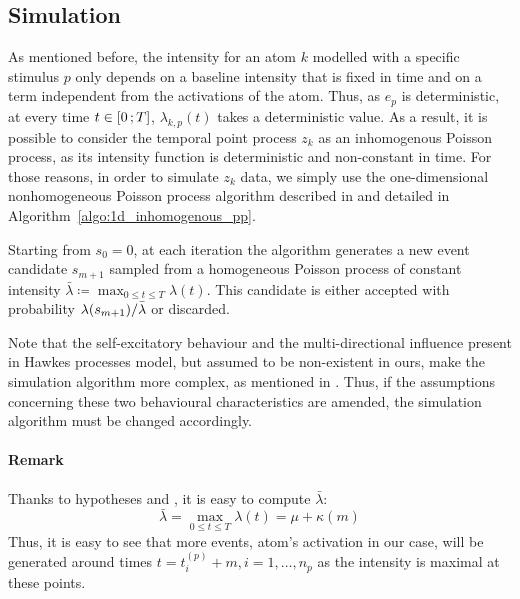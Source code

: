 \subsection{Simulation}

As mentioned before, the intensity for an atom $k$ modelled with a specific stimulus $p$ only depends on a baseline intensity that is fixed in time and on a term independent from the activations of the atom.
Thus, as $e_p$ is deterministic, at every time $t \in \left[ 0 \, ; T \right]$, $\lambda_{k,p}(t)$ takes a deterministic value.
As a result, it is possible to consider the temporal point process $z_k$ as an inhomogenous Poisson process, as its intensity function is deterministic and non-constant in time.
For those reasons, in order to simulate $z_k$ data, we simply use the one-dimensional nonhomogeneous Poisson process algorithm described in \citep{lewis1979simulation, chen2016thinning} and detailed in Algorithm~\ref{algo:1d_inhomogenous_pp}.

Starting from $s_0=0$, at each iteration the algorithm generates a new event candidate $s_{m+1}$ sampled from a homogeneous Poisson process of constant intensity $\bar{\lambda} \coloneqq \max_{0\leq t \leq T} \lambda(t)$.
This candidate is either accepted with probability $\lambda(s_{m+1})/\Bar{\lambda}$ or discarded.

Note that the self-excitatory behaviour and the multi-directional influence present in Hawkes processes model, but assumed to be non-existent in ours, make the simulation algorithm more complex, as mentioned in \citep{ogata1981lewis, chen2016thinning, bompaire2019machine}.
Thus, if the assumptions concerning these two behavioural characteristics are amended, the simulation algorithm must be changed accordingly.



\paragraph{Remark} Thanks to hypotheses  and , it is easy to compute $\bar{\lambda}$:
\begin{equation}\label{eq:max_lambda}
    \bar{\lambda} = \max_{0\leq t \leq T} \lambda(t) = \mu + \kappa(m)
\end{equation}
Thus, it is easy to see that more events, atom's activation in our case, will be generated around times $t = t_i^{(p)} + m, i=1,\dots,n_p$ as the intensity is maximal at these points.
